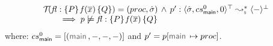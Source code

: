 \begin{theorem}\label{teo:bug:finding:sl}
$$
\begin{array}{l}
\testify{}(\specsig{\pass}{\pid(\jvec{x})}{\qass}{\flag})  = (\proc, \sstate) \, \wedge \, 
  \prog' :  \transabssemrule{\sstate, \csmain, 0}{-}{\top}{\bot}{\symbolic} \\ \quad \quad 
    \implies  
         \prog \not\satisfies \specsig{\pass}{\pid(\jvec{x})}{\qass}{\flag}
\end{array}
$$
\noindent where:  $\csmain = [ (\jsilmain, -, -, -) ]$ 
and $\prog' = \prog[\jsilmain \mapsto \proc]$.
\end{theorem}



%
%







